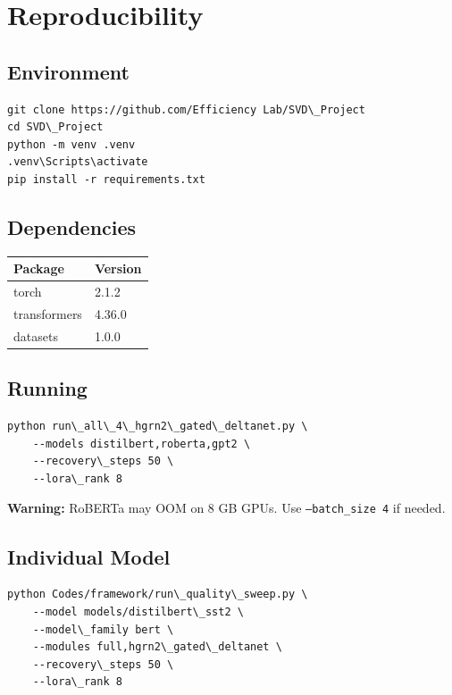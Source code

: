 \section{Reproducibility}

\subsection{Environment}

\begin{lstlisting}
git clone https://github.com/Efficiency Lab/SVD\_Project
cd SVD\_Project
python -m venv .venv
.venv\Scripts\activate
pip install -r requirements.txt
\end{lstlisting}

\subsection{Dependencies}

\begin{table}[H]
\centering
\small
\begin{tabular}{ll}
\toprule
\textbf{Package} & \textbf{Version} \\
\midrule
torch & 2.1.2 \\
transformers & 4.36.0 \\
datasets & 1.0.0 \\
\bottomrule
\end{tabular}
\end{table}

\subsection{Running}

\begin{lstlisting}
python run\_all\_4\_hgrn2\_gated\_deltanet.py \
    --models distilbert,roberta,gpt2 \
    --recovery\_steps 50 \
    --lora\_rank 8
\end{lstlisting}

\textbf{Warning:} RoBERTa may OOM on 8 GB GPUs. Use \texttt{--batch\_size 4} if needed.

\subsection{Individual Model}

\begin{lstlisting}
python Codes/framework/run\_quality\_sweep.py \
    --model models/distilbert\_sst2 \
    --model\_family bert \
    --modules full,hgrn2\_gated\_deltanet \
    --recovery\_steps 50 \
    --lora\_rank 8
\end{lstlisting}

